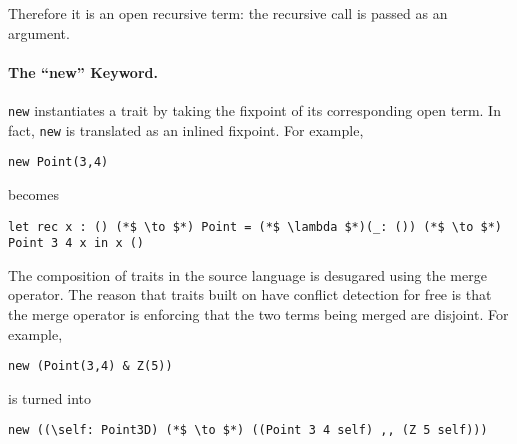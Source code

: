 Therefore it is an open recursive term: the recursive call is passed as an argument.

\paragraph{The ``new'' Keyword.} \lstinline$new$ instantiates a trait by taking the
fixpoint of its corresponding open term. In fact, \lstinline$new$ is translated as
an inlined fixpoint. For example,

\begin{lstlisting}
new Point(3,4)
\end{lstlisting}

becomes

\begin{lstlisting}
let rec x : () (*$ \to $*) Point = (*$ \lambda $*)(_: ()) (*$ \to $*) Point 3 4 x in x ()
\end{lstlisting}

The composition of traits in the source language is desugared using the merge
operator. The reason that traits built on \name have conflict detection for free
is that the merge operator is enforcing that the two terms being merged are
disjoint. For example,

\begin{lstlisting}
new (Point(3,4) & Z(5))
\end{lstlisting}

is turned into

\begin{lstlisting}
new ((\self: Point3D) (*$ \to $*) ((Point 3 4 self) ,, (Z 5 self)))
\end{lstlisting}

